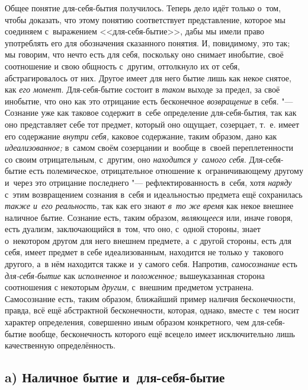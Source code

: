 Общее понятие для-себя-бытия получилось. Теперь дело идёт только о~том,
чтобы доказать, что этому понятию соответствует представление, которое мы
соединяем с~выражением <<для-себя-бытие>>, дабы мы имели право употреблять
его для обозначения сказанного понятия. И, повидимому, это так; мы говорим,
что нечто есть для себя, поскольку оно снимает инобытие, своё соотношение и
свою общность с~другим, оттолкнуло их от себя, абстрагировалось от них.
Другое имеет для него бытие лишь как некое снятое, как
{\em его момент}. Для-себя-бытие состоит в
{\em таком} выходе за предел, за своё инобытие, что оно
как это отрицание есть бесконечное {\em возвращение} в
себя. "--- Сознание уже как таковое содержит в~себе определение
для-себя-бытия, так как оно представляет себе тот предмет, который оно
ощущает, созерцает, т.~е. имеет его содержание
{\em внутри себя,} каковое содержание, таким образом,
дано как {\em идеализованное;} в~самом своём созерцании
и~вообще в~своей переплетенности со своим отрицательным, с~другим, оно
{\em находится у~самого себя}. Для-себя-бытие есть
полемическое, отрицательное отношение к~ограничивающему другому и~через это
отрицание последнего "--- рефлектированность в~себя, хотя
{\em наряду} с~этим возвращением сознания в~себя и
идеальностью предмета ещё сохранилась {\em также и~его
реальность,} так как его знают {\em в~то же время} как
некое внешнее наличное бытие. Сознание есть, таким образом,
{\em являющееся} или, иначе говоря, есть дуализм,
заключающийся в~том, что оно, с~одной стороны, знает о~некотором другом для
него внешнем предмете, а~с другой стороны, есть для себя, имеет предмет в
себе идеализованным, находится не только у~такового другого, а~в нём
находится также и~у самого себя. Напротив, {\em самосознание} есть
{\em для-себя-бытие} как {\em исполненное} и
{\em положенное;} вышеуказанная сторона соотношения с
некоторым {\em другим,} с~внешним предметом устранена.
Самосознание есть, таким образом, ближайший пример наличия бесконечности,
правда, всё ещё абстрактной бесконечности, которая, однако, вместе с~тем
носит характер определения, совершенно иным образом конкретного, чем
для-себя-бытие вообще, бесконечность которого ещё всецело имеет
исключительно лишь качественную определённость.

\subsection[a) Наличное бытие и~для-себя-бытие]{a) Наличное бытие и~для-себя-бытие}

